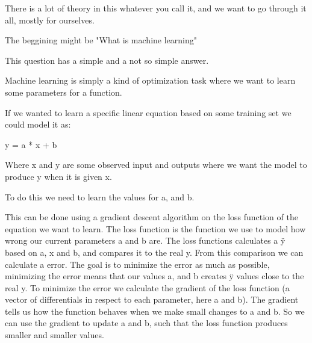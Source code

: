 There is a lot of theory in this whatever you call it, and we want to go through it all, mostly for ourselves. 

The beggining might be "What is machine learning"

This question has a simple and a not so simple answer.

Machine learning is simply a kind of optimization task where we want to learn some parameters for a function.

If we wanted to learn a specific linear equation based on some training set we could model it as:

y = a * x + b

Where x and y are some observed input and outputs where we want the model to produce y when it is given x.

To do this we need to learn the values for a, and b. 

This can be done using a gradient descent algorithm on the loss function of the equation we want to learn.
The loss function is the function we use to model how wrong our current parameters a and b are.
The loss functions calculates a ÿ based on a, x and b, and compares it to the real y. 
From this comparison we can calculate a error.
The goal is to minimize the error as much as possible, minimizing the error means that our values a, and b creates ÿ values close to the real y.
To minimize the error we calculate the gradient of the loss function (a vector of differentials in respect to each parameter, here a and b). 
The gradient tells us how the function behaves when we make small changes to a and b.
So we can use the gradient to update a and b, such that the loss function produces smaller and smaller values.